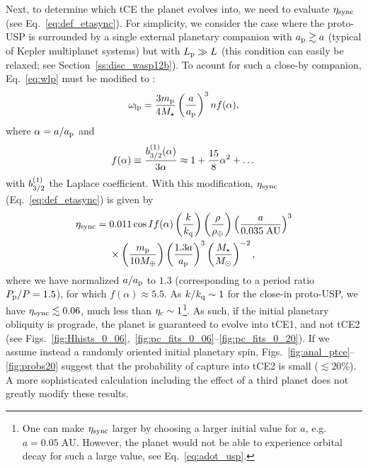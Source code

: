 \documentclass[
        fleqn,
        usenatbib,
        referee
    ]{mnras}
\newcommand*{\p}[1]{\left(#1\right)}
\begin{document}
Next, to determine which tCE the planet evolves into, we need to evaluate
$\eta_{\rm sync}$ (see Eq.~\ref{eq:def_etasync}). For simplicity, we consider
the case where the proto-USP is surrounded by a single external planetary
companion with $a_{\rm p} \gtrsim a$ (typical of Kepler multiplanet systems) but
with $L_{\rm p} \gg L$ (this condition can easily be relaxed; see
Section~\ref{ss:disc_wasp12b}). To acount for such a close-by companion,
Eq.~\eqref{eq:wlp} must be modified to \citep[see e.g.][]{lai_2017}:
\begin{equation}
    \omega_{\rm lp} = \frac{3m_{\rm p}}{4M_{\star}}
        \p{\frac{a}{a_{\rm p}}}^3 n f(\alpha),
        \label{eq:def_g_usp}
\end{equation}
where $\alpha = a / a_{\rm p}$ and
\begin{equation}
    f(\alpha) \equiv \frac{b_{\rm 3/2}^{(1)}(\alpha)}{3\alpha}
        \approx 1 + \frac{15}{8}\alpha^2 + \dots
\end{equation}
with $b_{\rm 3/2}^{(1)}$ the Laplace coefficient. With this modification,
$\eta_{\rm sync}$ (Eq.~\ref{eq:def_etasync}) is given by
\begin{align}
    \eta_{\rm sync} ={}& 0.011 \cos I f(\alpha)
            \p{\frac{k}{k_{\rm q}}}
            \p{\frac{\rho}{\rho_{\oplus}}}
            \p{\frac{a}{0.035 \;\mathrm{AU}}}^{3}\nonumber\\
        &\times
            \p{\frac{m_{\rm p}}{10 M_{\oplus}}}
            \p{\frac{1.3 a}{a_{\rm p}}}^{3}
            \p{\frac{M_\star}{M_{\odot}}}^{-2}
            ,\label{eq:etasync_usp}
\end{align}
where we have normalized $a / a_{\rm p}$ to $1.3$ (corresponding to a period
ratio $P_{\rm p} / P = 1.5$), for which $f(\alpha) \approx 5.5$. As $k / k_{\rm
q} \sim 1$ for the close-in proto-USP, we have $\eta_{\rm sync} \lesssim 0.06$,
much less than $\eta_{\rm c} \sim 1$\footnote{One can make $\eta_{\rm sync}$
larger by choosing a larger initial value for $a$, e.g.\ $a =
0.05\;\mathrm{AU}$. However, the planet would not be able to experience orbital
decay for such a large value, see Eq.~\eqref{eq:adot_usp}.}. As such, if the
initial planetary obliquity is prograde, the planet is guaranteed to evolve into
tCE1, and not tCE2 (see
Figs.~\ref{fig:Hhists_0_06},~\ref{fig:pc_fits_0_06}--\ref{fig:pc_fits_0_20}). If
we assume instead a randomly oriented initial planetary spin,
Figs.~\ref{fig:anal_ptce}--\ref{fig:probs20} suggest that the probability of
capture into tCE2 is small ($\lesssim 20\%$). A more sophisticated calculation
including the effect of a third planet does not greatly modify these results.
\end{document}
